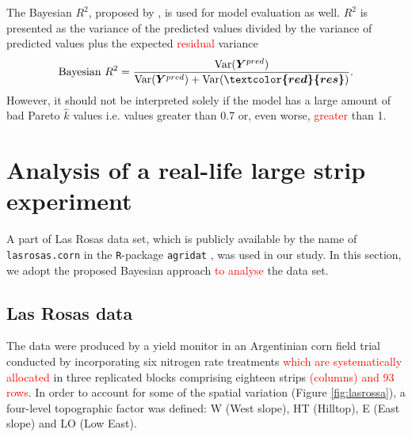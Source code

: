 \documentclass[a4paper]{article}   	%
\newcommand{\Var}{\mathrm{Var}}
\newcommand{\R}{\texttt{R}}
\begin{document}
	
	
	
	
	
	The Bayesian $R^2$, proposed by \textcite{Gelman2019Rsquared}, is used for model evaluation as well. $R^2$ is presented as the variance of the predicted values divided by the variance of predicted values plus the expected \textcolor{red}{residual} variance 
	\begin{eqnarray}
		\mbox{Bayesian } R^2 = \frac{\Var(\bm{Y}^{pred})}{\Var (\bm{Y}^{pred})+\Var(\bm{\textcolor{red}{res}})}.
	\end{eqnarray}
	However, it should not be interpreted solely if the model has a large amount of bad Pareto $\hat{k}$ values i.e. values greater than 0.7 or, even worse, \textcolor{red}{greater} than 1. 
	
	
	
	\section{Analysis of a real-life large strip experiment}\label{sec:analysis}
	
	A part of Las Rosas data set, which is publicly available by the name of \texttt{lasrosas.corn} in the \R-package \texttt{agridat} \parencite{Edmondson2014Agridat}, was used in our study. In this section, we adopt the proposed Bayesian approach \textcolor{red}{to analyse} the data set. 
	
	
	\subsection{Las Rosas data}
	
	The data were produced by a yield monitor in an Argentinian corn field trial conducted by incorporating six nitrogen rate treatments \textcolor{red}{which are systematically allocated} in three replicated blocks comprising eighteen strips \textcolor{red}{(columns) and 93 rows}. In order to account for some of the spatial variation (Figure \ref{fig:lasrossa}), a four-level topographic factor was defined: W (West slope), HT (Hilltop), E (East slope) and LO (Low East).  
	
\end{document}
